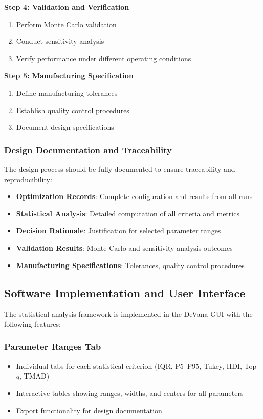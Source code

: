 \documentclass[12pt,a4paper]{article}
\newcommand{\softwareName}{DeVana}
\begin{document}
\textbf{Step 4: Validation and Verification}
\begin{enumerate}
    \item Perform Monte Carlo validation
    \item Conduct sensitivity analysis
    \item Verify performance under different operating conditions
\end{enumerate}

\textbf{Step 5: Manufacturing Specification}
\begin{enumerate}
    \item Define manufacturing tolerances
    \item Establish quality control procedures
    \item Document design specifications
\end{enumerate}

\subsubsection{Design Documentation and Traceability}

The design process should be fully documented to ensure traceability and reproducibility:

\begin{itemize}
    \item \textbf{Optimization Records}: Complete configuration and results from all runs
    \item \textbf{Statistical Analysis}: Detailed computation of all criteria and metrics
    \item \textbf{Decision Rationale}: Justification for selected parameter ranges
    \item \textbf{Validation Results}: Monte Carlo and sensitivity analysis outcomes
    \item \textbf{Manufacturing Specifications}: Tolerances, quality control procedures
\end{itemize}

\subsection{Software Implementation and User Interface}

The statistical analysis framework is implemented in the \softwareName{} GUI with the following features:

\subsubsection{Parameter Ranges Tab}
\begin{itemize}
    \item Individual tabs for each statistical criterion (IQR, P5--P95, Tukey, HDI, Top-$q$, TMAD)
    \item Interactive tables showing ranges, widths, and centers for all parameters
    \item Export functionality for design documentation
\end{itemize}
\end{document}
